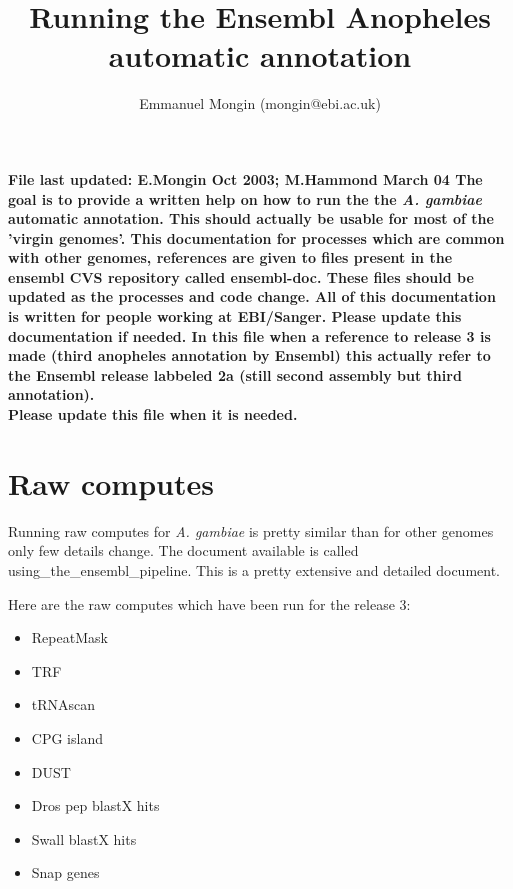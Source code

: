 \documentclass[a4paper,10pt]{article}
\title{Running the Ensembl Anopheles automatic annotation}
\author{Emmanuel Mongin (mongin@ebi.ac.uk)}
\begin{document}
\maketitle


\bf{File last updated: E.Mongin Oct 2003; M.Hammond March 04}
The goal is to provide a written help on how to run the the \textit{A. gambiae} automatic annotation. This should actually be usable for most of the 'virgin genomes'. This documentation for processes which are common with other genomes, references are given to files present in the ensembl CVS repository called ensembl-doc. These files should be updated as the processes and code change. All of this documentation is written for people working at EBI/Sanger. Please update this documentation if needed. In this file when a reference to release 3 is made (third anopheles annotation by Ensembl) this actually refer to the Ensembl release labbeled 2a (still second assembly but third annotation).\\
\bf{Please update this file when it is needed.}

\section{Raw computes}
Running raw computes for \textit{A. gambiae} is pretty similar than for other genomes only few details change.
The document available is called using\_the\_ensembl\_pipeline. This is a pretty extensive and detailed document.

Here are the raw computes which have been run for the release 3:
\begin{itemize}
\item RepeatMask
\item TRF
\item tRNAscan
\item CPG island
\item DUST
\item Dros pep blastX hits
\item Swall blastX hits
\item Snap genes
\end{itemize}
\end{document}
